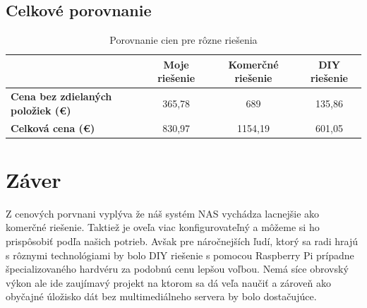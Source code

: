 \documentclass[12pt,oneside,slovak,a4paper]{article}
\begin{document}
\subsection{Celkové porovnanie}

\begin{table}[h]
\centering
\begin{tabular}{|l|c|c|c|}
\hline
\textbf{ } & \textbf{Moje riešenie} & \textbf{Komerčné riešenie} & \textbf{DIY riešenie} \\ \hline
\textbf{Cena bez zdielaných položiek (€)} & 365,78 & 689 & 135,86 \\ \hline
\textbf{Celková cena (€)} & 830,97 & 1154,19 & 601,05 \\ \hline
\end{tabular}
\caption{Porovnanie cien pre rôzne riešenia}
\end{table}


\section{Záver}
Z cenových porvnani vyplýva že náš systém NAS vychádza lacnejšie ako komerčné riešenie. Taktiež je oveľa viac konfigurovateľný a môžeme si ho prispôsobiť podľa našich potrieb. Avšak pre náročnejších ľudí, ktorý sa radi hrajú s rôznymi technológiami by bolo DIY riešenie s pomocou Raspberry Pi prípadne špecializovaného hardvéru za podobnú cenu lepšou voľbou. Nemá síce obrovský výkon ale ide zaujímavý projekt na ktorom sa dá veľa naučiť a zároveň ako obyčajné úložisko dát bez multimediálneho servera by bolo dostačujúce.

\pagebreak



\end{document}
